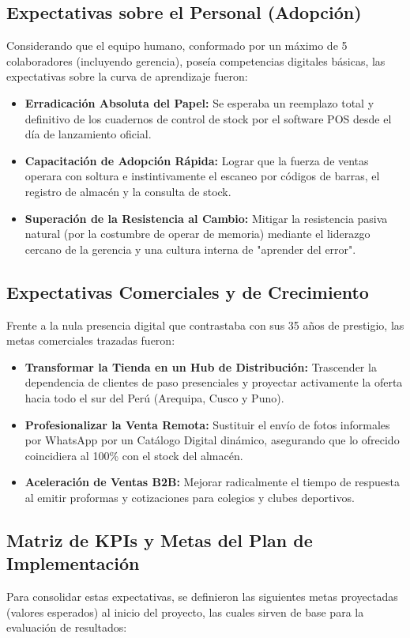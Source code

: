 \subsection{Expectativas sobre el Personal (Adopción)}
Considerando que el equipo humano, conformado por un máximo de 5 colaboradores (incluyendo gerencia), poseía competencias digitales básicas, las expectativas sobre la curva de aprendizaje fueron:
\begin{itemize}
    \item \textbf{Erradicación Absoluta del Papel:} Se esperaba un reemplazo total y definitivo de los cuadernos de control de stock por el software POS desde el día de lanzamiento oficial.
    \item \textbf{Capacitación de Adopción Rápida:} Lograr que la fuerza de ventas operara con soltura e instintivamente el escaneo por códigos de barras, el registro de almacén y la consulta de stock.
    \item \textbf{Superación de la Resistencia al Cambio:} Mitigar la resistencia pasiva natural (por la costumbre de operar de memoria) mediante el liderazgo cercano de la gerencia y una cultura interna de "aprender del error".
\end{itemize}

\subsection{Expectativas Comerciales y de Crecimiento}
Frente a la nula presencia digital que contrastaba con sus 35 años de prestigio, las metas comerciales trazadas fueron:
\begin{itemize}
    \item \textbf{Transformar la Tienda en un Hub de Distribución:} Trascender la dependencia de clientes de paso presenciales y proyectar activamente la oferta hacia todo el sur del Perú (Arequipa, Cusco y Puno).
    \item \textbf{Profesionalizar la Venta Remota:} Sustituir el envío de fotos informales por WhatsApp por un Catálogo Digital dinámico, asegurando que lo ofrecido coincidiera al 100\% con el stock del almacén.
    \item \textbf{Aceleración de Ventas B2B:} Mejorar radicalmente el tiempo de respuesta al emitir proformas y cotizaciones para colegios y clubes deportivos.
\end{itemize}

\subsection{Matriz de KPIs y Metas del Plan de Implementación}
Para consolidar estas expectativas, se definieron las siguientes metas proyectadas (valores esperados) al inicio del proyecto, las cuales sirven de base para la evaluación de resultados:

